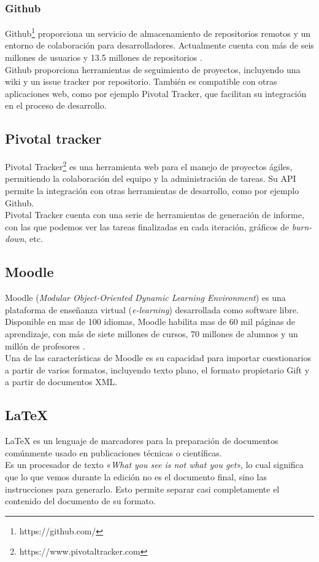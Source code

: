 \subsubsection{Github}
Github\footnote{https://github.com/} proporciona un servicio de almacenamiento de repositorios remotos y un entorno de colaboración para desarrolladores.
Actualmente cuenta con más de seis millones de usuarios y 13.5 millones de repositorios \cite{website:github}.
\\
Github proporciona herramientas de seguimiento de proyectos, incluyendo una wiki y un issue tracker por repositorio.
También es compatible con otras aplicaciones web, como por ejemplo Pivotal Tracker, que facilitan su integración en el proceso de desarrollo.

\subsection{Pivotal tracker}
Pivotal Tracker\footnote{https://www.pivotaltracker.com} es una herramienta web para el manejo de proyectos ágiles, permitiendo la colaboración del equipo y la administración de tareas.
Su API permite la integración con otras herramientas de desarrollo, como por ejemplo Github.
\\
Pivotal Tracker cuenta con una serie de herramientas de generación de informe, con las que podemos ver las tareas finalizadas en cada iteración, gráficos de \emph{burn-down}, etc.

\subsection{Moodle}
Moodle (\emph{Modular Object-Oriented Dynamic Learning Environment}) es una plataforma de enseñanza virtual (\emph{e-learning}) desarrollada como software libre.
Disponible en mas de 100 idiomas, Moodle habilita mas de 60 mil páginas de aprendizaje, con más de siete millones de cursos, 70 millones de alumnos y un millón de profesores \cite{website:moodle}.
\\
Una de las características de Moodle es su capacidad para importar cuestionarios a partir de varios formatos, incluyendo texto plano, el formato propietario Gift y a partir de documentos XML.

\subsection{\LaTeX{}}
\LaTeX{} es un lenguaje de marcadores para la preparación de documentos comúnmente usado en publicaciones técnicas o científicas.
\\
Es un procesador de texto «\emph{What you see is not what you get}», lo cual significa que lo que vemos durante la edición no es el 
documento final, sino las instrucciones para generarlo.
Esto permite separar casi completamente el contenido del documento de su formato.

